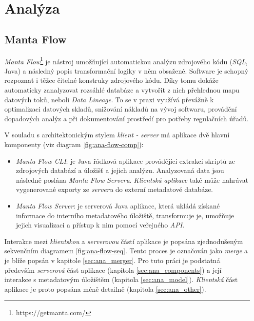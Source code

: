 \chapter{Analýza}
\section{Manta Flow}
\textit{Manta Flow}\footnote{https://getmanta.com/} je nástroj umožňující automatickou analýzu zdrojového kódu (\textit{SQL}, Java) a následný popis transformační logiky v něm obsažené. Software je schopný rozpoznat i těžce čitelné konstruky zdrojového kódu. Díky tomu dokáže automaticky zanalyzovat rozsáhlé databáze a vytvořit z nich přehlednou mapu datových toků, neboli \textit{Data Lineage}. To se v praxi využívá převážně k optimalizaci datových skladů, snižování nákladů na vývoj softwaru, provádění dopadových analýz a při dokumentování prostředí pro potřeby regulačních úřadů.

V souladu s architektonickým stylem \textit{klient - server} má aplikace dvě hlavní komponenty (viz diagram \ref{fig:ana-flow-comp}):
\begin{itemize}
	\item{\textit{Manta Flow CLI}}: je Java řádková aplikace provádějící extrakci skriptů ze zdrojových databází a úložišť a jejich analýzu. Analyzovaná data jsou následně poslána \textit{Manta Flow Serveru}. \textit{Klientská aplikace} také může nahrávat vygenerované exporty ze \textit{serveru} do externí metadatové databáze.
	\item{\textit{Manta Flow Server}}: je serverová Java aplikace, která ukládá získané informace do interního metadatového úložiště, transformuje je, umožňuje jejich visualizaci a přístup k nim pomocí veřejného \textit{API}.
\end{itemize}

Interakce mezi \textit{klientskou} a \textit{serverovou} částí aplikace je popsána zjednodušeným sekvenčním diagramem \ref{fig:ana-flow-seq}. Tento proces je označován jako \textit{merge} a je blíže popsán v kapitole \ref{sec:ana_merger}.
Pro tuto práci je podstatná především \textit{serverová} část aplikace (kapitola \ref{sec:ana_components}) a její interakce s metadatovým úložištěm (kapitola \ref{sec:ana_model}). \textit{Klientská} část aplikace je proto popsána méně detailně (kapitola \ref{sec:ana_other}).


